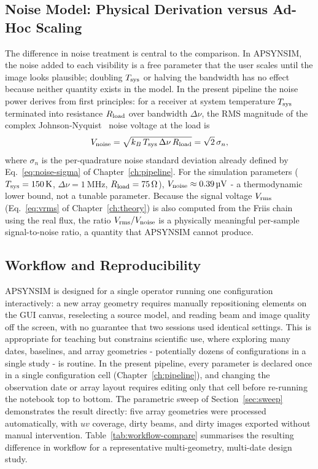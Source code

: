 \subsection{Noise Model: Physical Derivation versus Ad-Hoc Scaling}

The difference in noise treatment is central to the comparison. In
\textsc{APSYNSIM}, the noise added to each visibility is a free parameter
that the user scales until the image looks plausible; doubling $T_{\rm sys}$ or
halving the bandwidth has no effect because neither quantity exists in the model.
In the present pipeline the noise power derives from first principles: for a
receiver at system temperature $T_{\rm sys}$ terminated into resistance $R_{\rm load}$
over bandwidth $\Delta\nu$, the RMS magnitude of the complex Johnson-Nyquist~\citep{nyquist1928}
noise voltage at the load is
\begin{equation}
  V_{\rm noise} = \sqrt{k_B\,T_{\rm sys}\,\Delta\nu\,R_{\rm load}} = \sqrt{2}\,\sigma_n,
  \label{eq:johnson-rms}
\end{equation}
where $\sigma_n$ is the per-quadrature noise standard deviation already defined by
Eq.~\eqref{eq:noise-sigma} of Chapter~\ref{ch:pipeline}. For the simulation parameters
($T_{\rm sys}=\SI{150}{\kelvin}$, $\Delta\nu=\SI{1}{\mega\hertz}$,
$R_{\rm load}=\SI{75}{\ohm}$), $V_{\rm noise}\approx\SI{0.39}{\micro\volt}$ - a
thermodynamic lower bound, not a tunable parameter. Because the signal voltage
$V_{\rm rms}$ (Eq.~\eqref{eq:vrms} of Chapter~\ref{ch:theory}) is also computed from
the Friis chain using the real flux, the ratio $V_{\rm rms}/V_{\rm noise}$ is a
physically meaningful per-sample signal-to-noise ratio, a quantity that
\textsc{APSYNSIM} cannot produce.

\subsection{Workflow and Reproducibility}

\textsc{APSYNSIM} is designed for a single operator running one configuration
interactively: a new array geometry requires manually repositioning elements on the
GUI canvas, reselecting a source model, and reading beam and image quality off the
screen, with no guarantee that two sessions used identical settings. This is
appropriate for teaching but constrains scientific use, where exploring many dates,
baselines, and array geometries - potentially dozens of configurations in a single
study - is routine. In the present pipeline, every parameter is declared once in a
single configuration cell (Chapter~\ref{ch:pipeline}), and changing the observation
date or array layout requires editing only that cell before re-running the notebook
top to bottom. The parametric sweep of Section~\ref{sec:sweep} demonstrates the
result directly: five array geometries were processed automatically, with $uv$
coverage, dirty beams, and dirty images exported without manual intervention.
Table~\ref{tab:workflow-compare} summarises the resulting difference in workflow for a
representative multi-geometry, multi-date design study.

